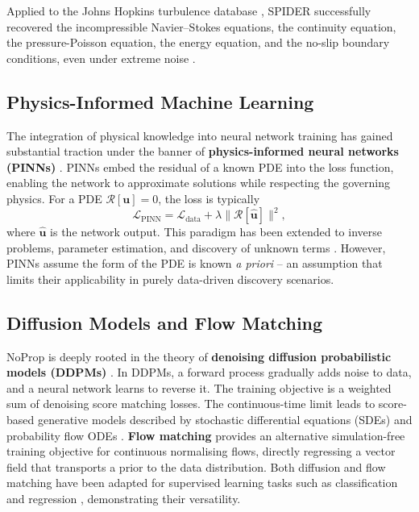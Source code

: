 \documentclass[preprint,12pt]{elsarticle}
\begin{document}
Applied to the Johns Hopkins turbulence database \cite{li2008public}, SPIDER successfully recovered the incompressible Navier--Stokes equations, the continuity equation, the pressure-Poisson equation, the energy equation, and the no-slip boundary conditions, even under extreme noise \cite{gurevich2024learning}.

\subsection{Physics-Informed Machine Learning}
\label{sec:piml}

The integration of physical knowledge into neural network training has gained substantial traction under the banner of \textbf{physics-informed neural networks (PINNs)} \cite{raissi2019physics,karniadakis2021physics}. PINNs embed the residual of a known PDE into the loss function, enabling the network to approximate solutions while respecting the governing physics. For a PDE $\mathcal{R}[\mathbf{u}]=0$, the loss is typically
\begin{equation}
\label{eq:pinn-loss}
\mathcal{L}_{\text{PINN}} = \mathcal{L}_{\text{data}} + \lambda \|\mathcal{R}[\hat{\mathbf{u}}]\|^2,
\end{equation}
where $\hat{\mathbf{u}}$ is the network output. This paradigm has been extended to inverse problems, parameter estimation, and discovery of unknown terms \cite{willard2020integrating,karpatne2017theory}. However, PINNs assume the form of the PDE is known \textit{a priori} -- an assumption that limits their applicability in purely data-driven discovery scenarios.

\subsection{Diffusion Models and Flow Matching}
\label{sec:diffusion}

NoProp is deeply rooted in the theory of \textbf{denoising diffusion probabilistic models (DDPMs)} \cite{sohl2015deep,ho2020denoising,song2021maximum}. In DDPMs, a forward process gradually adds noise to data, and a neural network learns to reverse it. The training objective is a weighted sum of denoising score matching losses. The continuous-time limit leads to score-based generative models described by stochastic differential equations (SDEs) and probability flow ODEs \cite{song2021maximum}. \textbf{Flow matching} \cite{lipman2022flow,tong2023improving} provides an alternative simulation-free training objective for continuous normalising flows, directly regressing a vector field that transports a prior to the data distribution. Both diffusion and flow matching have been adapted for supervised learning tasks such as classification and regression \cite{han2022card,kim2025simulation,hu2024flow}, demonstrating their versatility.
\end{document}
